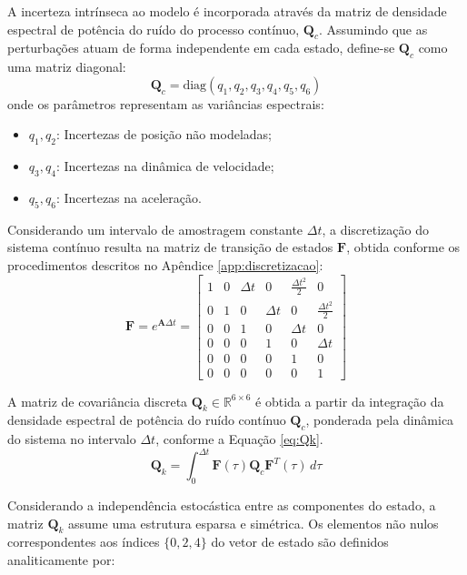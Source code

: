 \documentclass[journal]{IEEEtran}
\begin{document}
A incerteza intrínseca ao modelo é incorporada através da matriz de densidade espectral de potência do ruído do processo contínuo, $\mathbf{Q}_c$. Assumindo que as perturbações atuam de forma independente em cada estado, define-se $\mathbf{Q}_c$ como uma matriz diagonal:
\begin{equation}
    \mathbf{Q}_c = \text{diag}(q_1, q_2, q_3, q_4, q_5, q_6)
\end{equation}
onde os parâmetros representam as variâncias espectrais:
\begin{itemize}
    \item $q_1, q_2$: Incertezas de posição não modeladas;
    \item $q_3, q_4$: Incertezas na dinâmica de velocidade;
    \item $q_5, q_6$: Incertezas na aceleração.
\end{itemize}

Considerando um intervalo de amostragem constante $\Delta t$, a discretização do sistema contínuo resulta na matriz de transição de estados $\mathbf{F}$, obtida conforme os procedimentos descritos no Apêndice \ref{app:discretizacao}:
\begin{equation}
    \mathbf{F} = e^{\mathbf{A}\Delta t} = \begin{bmatrix} 
    1 & 0 & \Delta t & 0 & \frac{\Delta t^2}{2} & 0 \\ 
    0 & 1 & 0 & \Delta t & 0 & \frac{\Delta t^2}{2} \\ 
    0 & 0 & 1 & 0 & \Delta t & 0 \\ 
    0 & 0 & 0 & 1 & 0 & \Delta t \\ 
    0 & 0 & 0 & 0 & 1 & 0 \\ 
    0 & 0 & 0 & 0 & 0 & 1 
    \end{bmatrix}
\end{equation}

A matriz de covariância discreta $\mathbf{Q}_k \in \mathbb{R}^{6\times6}$ é obtida a partir da integração da densidade espectral de potência do ruído contínuo $\mathbf{Q}_c$, ponderada pela dinâmica do sistema no intervalo $\Delta t$, conforme a Equação \eqref{eq:Qk}.
\begin{equation}
    \label{eq:Qk}
    \mathbf{Q}_k = \int_{0}^{\Delta t} \mathbf{F}(\tau) \mathbf{Q}_c \mathbf{F}^T(\tau) \, d\tau
\end{equation}

Considerando a independência estocástica entre as componentes do estado, a matriz $\mathbf{Q}_k$ assume uma estrutura esparsa e simétrica. Os elementos não nulos correspondentes aos índices $\{0, 2, 4\}$ do vetor de estado são definidos analiticamente por:
\end{document}
